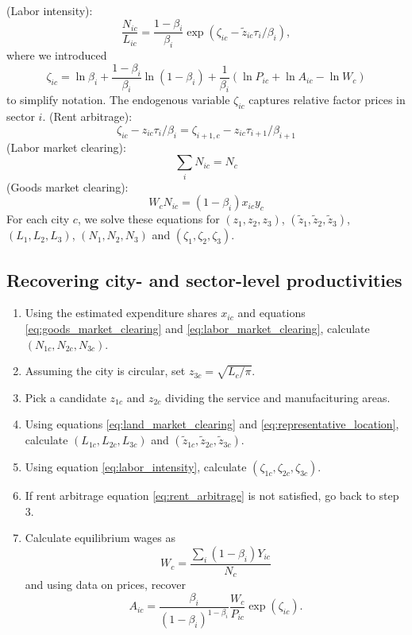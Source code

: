 \documentclass[12pt]{article}
\begin{document}
(Labor intensity):
\begin{equation}\label{eq:labor_intensity}
	\frac 	{N_{ic}}
			{L_{ic}}
	=
	\frac 	{1-\beta_i}
			{\beta_i}
	\exp(\zeta_{ic}-\tilde z_{ic} \tau_i/\beta_i),
\end{equation}
where we introduced
\[
\zeta_{ic}=\ln\beta_i + \frac{1-\beta_i}{\beta_i} \ln (1-\beta_i)
+ \frac 1{\beta_i} (\ln P_{ic} + \ln A_{ic} - \ln W_c)
\]
to simplify notation. The endogenous variable $\zeta_{ic}$ captures relative factor prices in sector $i$.
(Rent arbitrage):
\begin{equation}\label{eq:rent_arbitrage}
	\zeta_{ic} - z_{ic} \tau_i/\beta_i
	=
	\zeta_{i+1,c} - z_{ic} \tau_{i+1}/\beta_{i+1}
\end{equation}
(Labor market clearing):
\begin{equation}\label{eq:labor_market_clearing}
	\sum_i N_{ic} = N_c
\end{equation}
(Goods market clearing):
\begin{equation}\label{eq:goods_market_clearing}
	W_c N_{ic}
	=
	(1-\beta_i)x_{ic}y_c
\end{equation}
For each city $c$, we solve these equations for $(z_1,z_2,z_3)$, $(\tilde z_1,\tilde z_2,\tilde z_3)$, $(L_1,L_2,L_3)$, $(N_1,N_2,N_3)$ and $(\zeta_1,\zeta_2,\zeta_3)$.

\subsection{Recovering city- and sector-level productivities}
\begin{enumerate}
	\item Using the estimated expenditure shares $x_{ic}$ and equations \eqref{eq:goods_market_clearing} and \eqref{eq:labor_market_clearing}, calculate $(N_{1c},N_{2c},N_{3c})$.
	\item Assuming the city is circular, set $z_{3c}=\sqrt{L_c/\pi}$.
	\item Pick a candidate $z_{1c}$ and $z_{2c}$ dividing the service and manufacituring areas.
	\item Using equations \eqref{eq:land_market_clearing} and \eqref{eq:representative_location}, calculate $(L_{1c}, L_{2c}, L_{3c})$ and $(\tilde z_{1c}, \tilde z_{2c}, \tilde z_{3c})$.
	\item Using equation \eqref{eq:labor_intensity}, calculate $(\zeta_{1c}, \zeta_{2c}, \zeta_{3c})$.
	\item If rent arbitrage equation \eqref{eq:rent_arbitrage} is not satisfied, go back to step 3.
	\item Calculate equilibrium wages as
	\[
		W_c = \frac
			{\sum_i (1-\beta_i)Y_{ic}}
			{N_c}
	\]
	and using data on prices, recover
	\[
		A_{ic} =
			 \frac {\beta_i}{(1-\beta_i)^{1-\beta_i}}
			 \frac {W_c}{P_{ic}}
			 \exp(\zeta_{ic}).
	\]
\end{enumerate}
\end{document}
